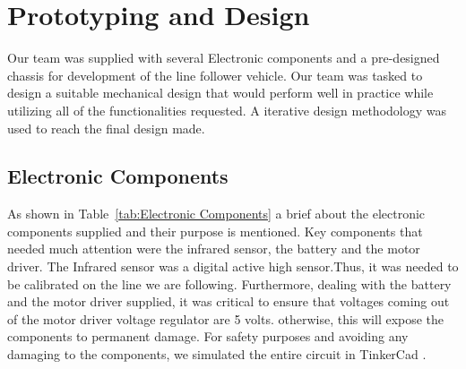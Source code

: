 \documentclass[conference]{IEEEtran}
\begin{document}
\section{Prototyping and Design}
Our team was supplied with several Electronic components and a pre-designed chassis for development of the line follower vehicle. Our team was tasked to design a suitable mechanical design that would perform well in practice while utilizing all of the functionalities requested. A iterative design methodology was used to reach the final design made. 
\subsection{Electronic Components}
As shown in Table~\ref{tab:Electronic Components} a brief about the electronic components supplied and their purpose is mentioned. Key components that needed much attention were the infrared sensor, the battery and the motor driver. The Infrared sensor was a digital active high sensor.Thus, it was needed to be calibrated on the line we are following. Furthermore, dealing with the battery and the motor driver supplied, it was critical to ensure that voltages coming out of the motor driver voltage regulator are 5 volts. otherwise, this will expose the components to permanent damage. For safety purposes and avoiding any damaging to the components, we simulated the entire circuit in TinkerCad \cite{tinkercad}.
\end{document}
